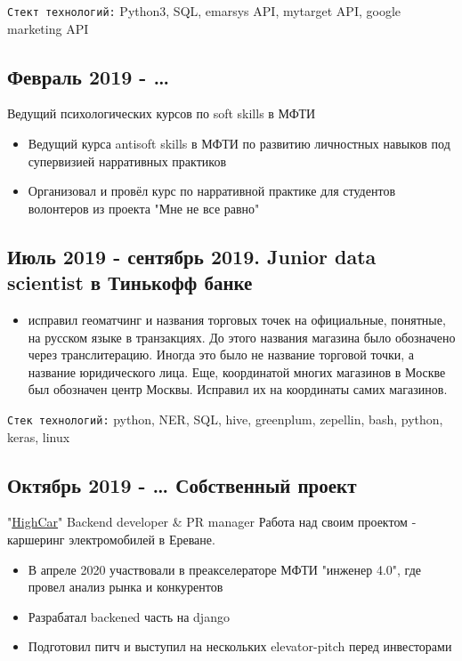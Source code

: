 \documentclass[11pt]{article}
\begin{document}
\texttt{Стект технологий:}
Python3, SQL, emarsys API, mytarget API, google marketing API
\subsection{Февраль 2019 - \ldots{}}
\label{sec:orga645cc5}
Ведущий психологических курсов по soft skills в МФТИ
\begin{itemize}
\item Ведущий курса antisoft skills в МФТИ по развитию личностных навыков под супервизией нарративных практиков
\item Организовал и провёл курс по нарративной практике для студентов волонтеров из проекта "Мне не все равно"
\end{itemize}
\subsection{Июль 2019 - сентябрь 2019. Junior data scientist в Тинькофф банке}
\label{sec:orge3ac759}
\begin{itemize}
\item исправил геоматчинг и названия торговых точек на официальные, понятные, на русском языке в транзакциях. До этого названия магазина было обозначено через транслитерацию. Иногда это было не название торговой точки, а название юридического лица. Еще, координатой многих магазинов в Москве был обозначен центр Москвы. Исправил их на координаты самих магазинов.
\end{itemize}

\texttt{Cтек технологий:} python, NER, SQL, hive, greenplum, zepellin, bash, python, keras, linux
\subsection{Октябрь 2019 - \ldots{} Собственный проект}
\label{sec:orgbbe577e}
"\href{https://docs.google.com/presentation/d/1AiwyzLKDgDXIaclUwoyGgT-VDJMtJYJQqAMVfbNlB40/edit\#slide=id.p1}{HighCar}"
Backend developer \& PR manager
Работа над своим проектом - каршеринг электромобилей в Ереване.
\begin{itemize}
\item В апреле 2020 участвовали в преакселераторе МФТИ "инженер 4.0", где провел анализ рынка и конкурентов
\item Разрабатал backened часть на django
\item Подготовил питч и выступил на нескольких elevator-pitch перед инвесторами
\end{itemize}
\end{document}
